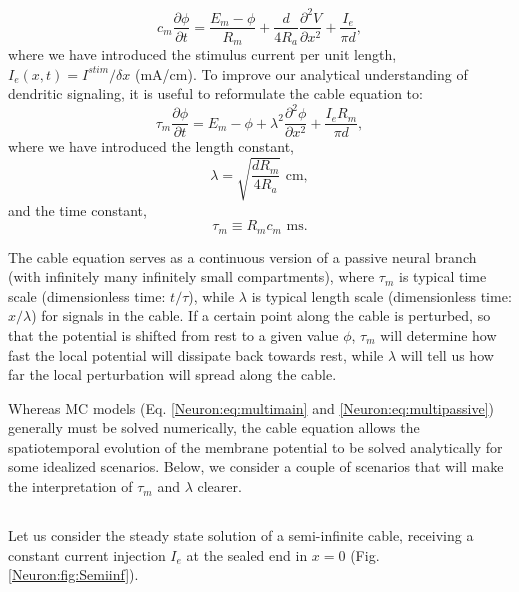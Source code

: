 \begin{equation}
c_m \frac{\partial \phi}{\partial t} = \frac{E_m-\phi}{R_m} +  \frac{d}{4 R_a}  \frac{\partial^2 V}{\partial x^2}  + \frac{I_e}{\pi d},
\label{Neuron:eq:cable}
\end{equation}
where we have introduced the stimulus current per unit length, $I_e(x,t) = I^{stim}/\delta x$ (mA/cm). To improve our analytical understanding of dendritic signaling, it is useful to reformulate the cable equation to:
\begin{equation}
\tau_m \frac{\partial \phi}{\partial t} = E_m-\phi +   \lambda^2  \frac{\partial^2 \phi}{\partial x^2}  + \frac{I_e R_m}{\pi d},
\label{Neuron:eq:cable2}
\end{equation}
where we have introduced the length constant,
\begin{equation}
\lambda = \sqrt{\frac{d R_m}{4 R_a}} \,\, \text{cm}, 
\label{Neuron:eq:lengthconst}
\end{equation}
and the time constant, 
\begin{equation}
\tau_m \equiv R_m c_m  \,\, \text{ms}.
\label{Neuron:eq:timeconst}
\end{equation}

The cable equation serves as a continuous version of a passive neural branch (with infinitely many infinitely small compartments), where $\tau_m$ is typical time scale (dimensionless time: $t/\tau$), while $\lambda$  is typical length scale  (dimensionless time: $x/\lambda$) for signals in the cable. If a certain point along the cable is perturbed, so that the potential is shifted from rest to a given value $\phi$, $\tau_m$ will determine how fast the local potential will dissipate back towards rest, while $\lambda$ will tell us how far the local perturbation will spread along the cable. 

Whereas MC models (Eq. \ref{Neuron:eq:multimain} and \ref{Neuron:eq:multipassive}) generally must be solved numerically, the cable equation allows the spatiotemporal evolution of the membrane potential to be solved analytically for some idealized scenarios. Below, we consider a couple of scenarios that will  make the interpretation of $\tau_m$ and $\lambda$ clearer. 


\subsection{}
\label{sec:Neuron:cableSS}
Let us consider the steady state solution of a semi-infinite cable, receiving a constant current injection $I_e$ at the sealed end in $x=0$ (Fig. \ref{Neuron:fig:Semiinf}).

